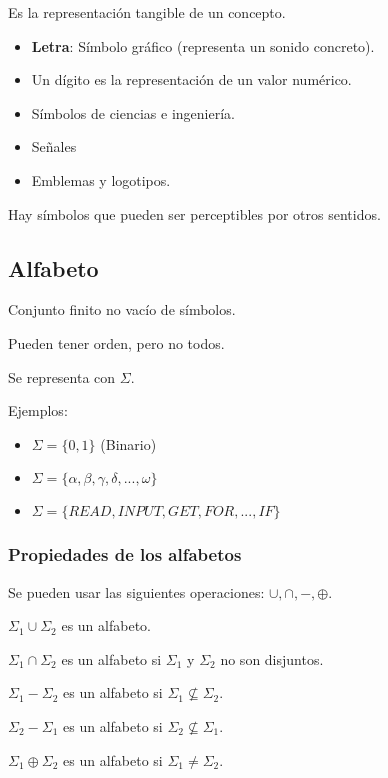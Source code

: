 \documentclass{article}
\begin{document}
Es la representación tangible de un concepto.

\begin{itemize}
	\item
	\textbf{Letra}: Símbolo gráfico (representa un sonido concreto).
	\item
	Un dígito es la representación de un valor numérico.
	\item
	Símbolos de ciencias e ingeniería.
	\item
	Señales
	\item
	Emblemas y logotipos.
\end{itemize}

Hay símbolos que pueden ser perceptibles por otros sentidos.

\subsection{Alfabeto}

Conjunto finito no vacío de símbolos.

Pueden tener orden, pero no todos.

Se representa con $\Sigma$.
\vspace{1em}

Ejemplos:

\begin{itemize}
	\item
	$\Sigma = \{0, 1\}$ (Binario)
	\item
	$\Sigma = \{\alpha, \beta, \gamma, \delta, ..., \omega\}$
	\item
	$\Sigma = \{READ, INPUT, GET, FOR, ..., IF\}$
\end{itemize}

\subsubsection{Propiedades de los alfabetos}

Se pueden usar las siguientes operaciones: $\cup, \cap, -, \oplus$.

$\Sigma_1 \cup \Sigma_2$ es un alfabeto.

$\Sigma_1 \cap \Sigma_2$ es un alfabeto si $\Sigma_1$ y $\Sigma_2$ no son
disjuntos.

$\Sigma_1 - \Sigma_2$ es un alfabeto si $\Sigma_1 \not\subseteq \Sigma_2$.

$\Sigma_2 - \Sigma_1$ es un alfabeto si $\Sigma_2 \not\subseteq \Sigma_1$.

$\Sigma_1 \oplus \Sigma_2$ es un alfabeto si $\Sigma_1 \ne \Sigma_2$.
\vspace{1em}
\end{document}
